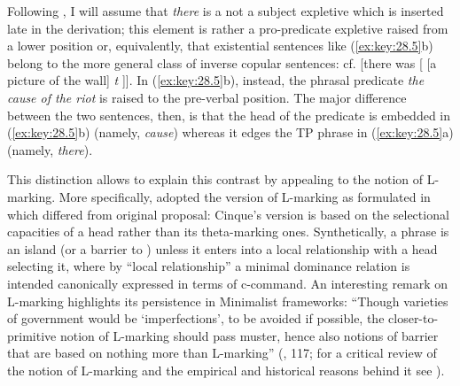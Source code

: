 \documentclass[output=paper]{langsci/langscibook}
\begin{document}
\ea%
    \label{ex:key:28.5}
	\z
\z

Following \textcite{Moro1988,Moro1997}, I will assume that \emph{there} is a
not a subject expletive which is inserted late in the derivation; this element
is rather a pro-predicate expletive raised from a lower position or,
equivalently, that existential sentences like (\ref{ex:key:28.5}b) belong to the
more general class of inverse copular sentences: cf. [there was [ [a picture of
the wall] \emph{t} ]]. In (\ref{ex:key:28.5}b), instead, the phrasal predicate
\emph{the cause of the riot} is raised to the pre-verbal position. The major
difference between the two sentences, then, is that the head of the predicate
is embedded in (\ref{ex:key:28.5}b) (namely, \emph{cause}) whereas it edges the TP
phrase in (\ref{ex:key:28.5}a) (namely, \emph{there}).

This distinction allows to explain this contrast by appealing to the notion of
L-marking. More specifically, \citet{Moro1997} adopted the version of L-marking
as formulated in \citet{Cinque1990} which differed from 
original proposal: Cinque's version is based on the selectional capacities of a
head rather than its theta-marking ones. Synthetically, a phrase is an
island
(or a barrier to ) unless it enters into a local relationship with a
head selecting it, where by “local relationship” a minimal dominance relation
is intended canonically expressed in terms of c-command. An interesting remark
on L-marking highlights its persistence in Minimalist frameworks: “Though
varieties of government would be `imperfections', to be avoided if possible,
the closer-to-primitive notion of L-marking should pass muster, hence also
notions of barrier that are based on nothing more than L-marking”
(\citealt{Chomsky2000}, 117; for a critical review of the notion of L-marking
and the empirical and historical reasons behind it see \citealt{Roberts1988}).
\end{document}
